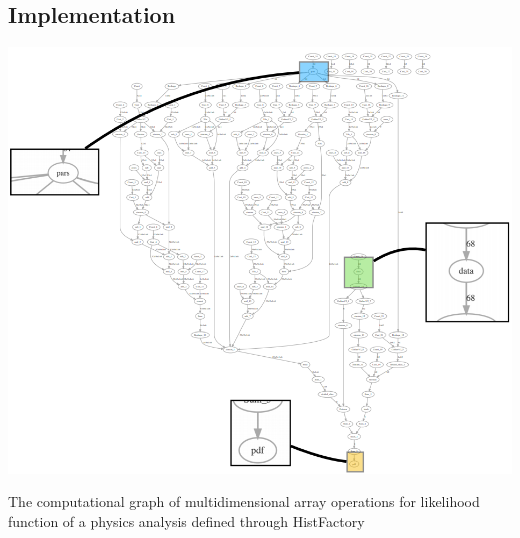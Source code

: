 \documentclass[a0,portrait]{a0poster}
\begin{document}
\begin{multicols}{2}
 \section*{\LARGE\color{MediumBlue} Implementation}
 \begin{center}
  \includegraphics[width=0.9\linewidth]{computational_graph.png}
 \end{center}
 The computational graph of multidimensional array operations for likelihood function of a physics analysis defined through HistFactory


\end{multicols}
\end{document}
